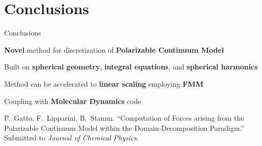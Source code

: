 \section{{\bf Conclusions}}


\begin{frame}{Conclusions}

\begin{wideitemize}
\item {\bf Novel} method for discretization of {\bf Polarizable Continuum Model}
\item Built on {\bf spherical geometry}, {\bf integral equations}, and {\bf spherical harmonics}
\item Method can be accelerated to {\bf linear scaling} employing {\bf FMM}
\item Coupling with {\bf Molecular Dynamics} code
\item
\end{wideitemize}


\vfill

{\footnotesize
{P.~Gatto}, F.~Lipparini, B.~Stamm. ``Computation of Forces arising from the Polarizable Continuum Model within the Domain-Decomposition Paradigm.'' Submitted to \textit{Journal of Chemical Physics}.
}
\end{frame}

%
%
%
%
%
%


